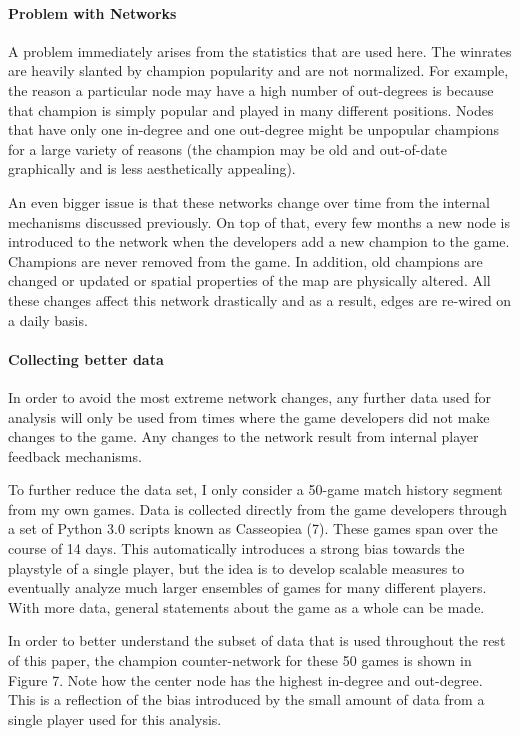 \documentclass[twoside]{article}
\begin{document}
\begin{multicols}{2}
\paragraph{Problem with Networks}
A problem immediately arises from the statistics that are used here. The winrates are heavily slanted by champion popularity and are not normalized. For example, the reason a particular node may have a high number of out-degrees is because that champion is simply popular and played in many different positions. Nodes that have only one in-degree and one out-degree might be unpopular champions for a large variety of reasons (the champion may be old and out-of-date graphically and is less aesthetically appealing).

An even bigger issue is that these networks change over time from the internal mechanisms discussed previously. On top of that, every few months a new node is introduced to the network when the developers add a new champion to the game. Champions are never removed from the game. In addition, old champions are changed or updated or spatial properties of the map are physically altered. All these changes affect this network drastically and as a result, edges are re-wired on a daily basis. 

\paragraph{Collecting better data}
In order to avoid the most extreme network changes, any further data used for analysis will only be used from times where the game developers did not make changes to the game. Any changes to the network result from internal player feedback mechanisms. 

To further reduce the data set, I only consider a 50-game match history segment from my own games. Data is collected directly from the game developers through a set of Python 3.0 scripts known as Casseopiea (7). These games span over the course of 14 days. This automatically introduces a strong bias towards the playstyle of a single player, but the idea is to develop scalable measures to eventually analyze much larger ensembles of games for many different players. With more data, general statements about the game as a whole can be made.

In order to better understand the subset of data that is used throughout the rest of this paper, the champion counter-network for these 50 games is shown in Figure 7. Note how the center node has the highest in-degree and out-degree. This is a reflection of the bias introduced by the small amount of data from a single player used for this analysis.


\end{multicols}
\end{document}
